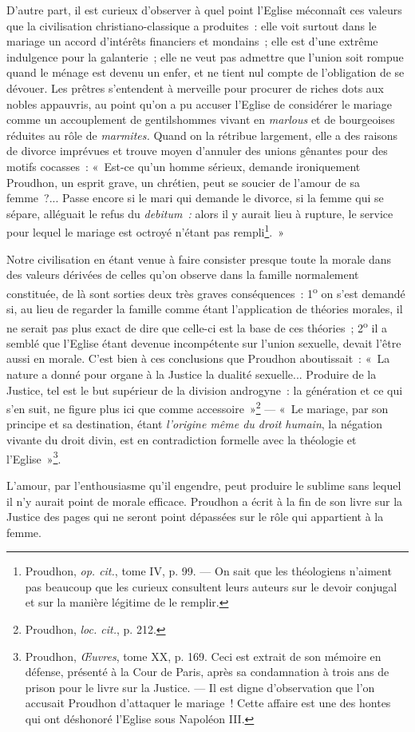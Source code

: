 \documentclass[french,twoside]{book} %
\begin{document}
D’autre part, il est curieux d’observer à quel point l’Eglise méconnaît ces valeurs que la civilisation christiano-classique a produites : elle voit surtout dans le mariage un accord d’intérêts financiers et mondains ; elle est d’une extrême indulgence pour la galanterie ; elle ne veut pas admettre que l’union soit rompue quand le ménage est devenu un enfer, et ne tient nul compte de l’obligation de se dévouer. Les prêtres s’entendent à merveille pour procurer de riches dots aux nobles appauvris, au point qu’on a pu accuser l’Eglise de considérer le mariage comme un accouplement de gentilshommes vivant en \emph{marlous} et de bourgeoises réduites au rôle de \emph{marmites.} Quand on la rétribue largement, elle a des raisons de divorce imprévues et trouve moyen  d’annuler des unions gênantes pour des motifs cocasses : « Est-ce qu’un homme sérieux, demande ironiquement Proudhon, un esprit grave, un chrétien, peut se soucier de l’amour de sa femme ?... Passe encore si le mari qui demande le divorce, si la femme qui se sépare, alléguait le refus du \emph{debitum :} alors il y aurait lieu à rupture, le service pour lequel le mariage est octroyé n’étant pas rempli\footnote{ \noindent Proudhon, \emph{op. cit.}, tome IV, p. 99. — On sait que les théologiens n’aiment pas beaucoup que les curieux consultent leurs auteurs sur le devoir conjugal et sur la manière légitime de le remplir.
 }. »\par
Notre civilisation en étant venue à faire consister presque toute la morale dans des valeurs dérivées de celles qu’on observe dans la famille normalement constituée, de là sont sorties deux très graves conséquences : 1\textsuperscript{o} on s’est demandé si, au lieu de regarder la famille comme étant l’application de théories morales, il ne serait pas plus exact de dire que celle-ci est la base de ces théories ; 2\textsuperscript{o} il a semblé que l’Eglise étant devenue incompétente sur l’union sexuelle, devait l’être aussi en morale. C’est bien à ces conclusions que Proudhon aboutissait : « La nature a donné pour organe à la Justice la dualité sexuelle... Produire de la Justice, tel est le but supérieur de la division androgyne : la génération et ce qui s’en suit, ne figure plus ici que comme accessoire »\footnote{ \noindent Proudhon, \emph{loc. cit.}, p. 212.
 } — « Le mariage, par son principe et sa destination, étant \emph{l’origine même du droit humain}, la négation  vivante du droit divin, est en contradiction formelle avec la théologie et l’Eglise »\footnote{ \noindent Proudhon, \emph{Œuvres}, tome XX, p. 169. Ceci est extrait de son mémoire en défense, présenté à la Cour de Paris, après sa condamnation à trois ans de prison pour le livre sur la Justice. — Il est digne d’observation que l’on accusait Proudhon d’attaquer le mariage ! Cette affaire est une des hontes qui ont déshonoré l’Eglise sous Napoléon III.
 }.\par
L’amour, par l’enthousiasme qu’il engendre, peut produire le sublime sans lequel il n’y aurait point de morale efficace. Proudhon a écrit à la fin de son livre sur la Justice des pages qui ne seront point dépassées sur le rôle qui appartient à la femme.\par
\end{document}
